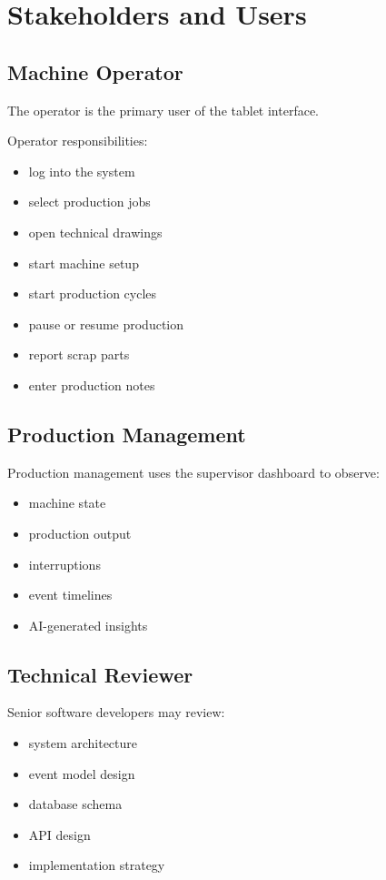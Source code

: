 \documentclass[11pt]{article}
\begin{document}
\section{Stakeholders and Users}
\subsection{Machine Operator}
The operator is the primary user of the tablet interface.

Operator responsibilities:
\begin{itemize}
\item log into the system
\item select production jobs
\item open technical drawings
\item start machine setup
\item start production cycles
\item pause or resume production
\item report scrap parts
\item enter production notes
\end{itemize}

\subsection{Production Management}
Production management uses the supervisor dashboard to observe:
\begin{itemize}
\item machine state
\item production output
\item interruptions
\item event timelines
\item AI-generated insights
\end{itemize}

\subsection{Technical Reviewer}
Senior software developers may review:
\begin{itemize}
\item system architecture
\item event model design
\item database schema
\item API design
\item implementation strategy
\end{itemize}
\end{document}
